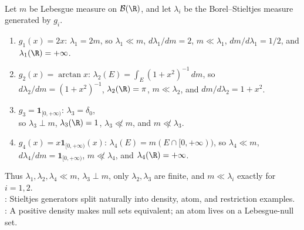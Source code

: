 \begin{example} \label{ex:stieltjes-basic-generators-rn-classification} \\
Let $m$ be Lebesgue measure on $\mathcal{B}(\R)$, and let $\lambda_i$ be the Borel--Stieltjes measure generated by $g_i$.
\begin{enumerate}[label=(\roman*)]
\setlength{\itemsep}{0pt}
\item $g_1(x)=2x$: $\lambda_1=2m$, so $\lambda_1\ll m$, $d\lambda_1/dm=2$, $m\ll\lambda_1$, $dm/d\lambda_1=1/2$, and $\lambda_1(\R)=+\infty$.
\item $g_2(x)=\arctan x$: $\lambda_2(E)=\int_E(1+x^2)^{-1}\,dm$, so $d\lambda_2/dm=(1+x^2)^{-1}$, $\lambda_2(\R)=\pi$, $m\ll\lambda_2$, and $dm/d\lambda_2=1+x^2$.
\item $g_3=\mathbf{1}_{[0,+\infty)}$: $\lambda_3=\delta_0$,\\
so $\lambda_3\perp m$, $\lambda_3(\R)=1$, $\lambda_3\not\ll m$, and $m\not\ll\lambda_3$.
\item $g_4(x)=x\mathbf{1}_{[0,+\infty)}(x)$: $\lambda_4(E)=m(E\cap[0,+\infty))$, so $\lambda_4\ll m$, $d\lambda_4/dm=\mathbf{1}_{[0,+\infty)}$, $m\not\ll\lambda_4$, and $\lambda_4(\R)=+\infty$.
\end{enumerate}
Thus $\lambda_1,\lambda_2,\lambda_4\ll m$, $\lambda_3\perp m$, only $\lambda_2,\lambda_3$ are finite, and $m\ll\lambda_i$ exactly for $i=1,2$.\\
: Stieltjes generators split naturally into density, atom, and restriction examples.\\
: A positive density makes null sets equivalent; an atom lives on a Lebesgue-null set.
\end{example}

